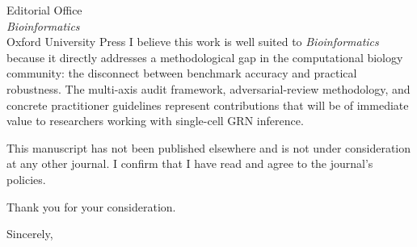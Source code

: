 \documentclass[12pt]{letter}
\begin{document}
\begin{letter}{Editorial Office\\
\textit{Bioinformatics}\\
Oxford University Press}
I believe this work is well suited to \textit{Bioinformatics} because it directly addresses a methodological gap in the computational biology community: the disconnect between benchmark accuracy and practical robustness. The multi-axis audit framework, adversarial-review methodology, and concrete practitioner guidelines represent contributions that will be of immediate value to researchers working with single-cell GRN inference.

This manuscript has not been published elsewhere and is not under consideration at any other journal. I confirm that I have read and agree to the journal's policies.

Thank you for your consideration.

\closing{Sincerely,}

\end{letter}
\end{document}
